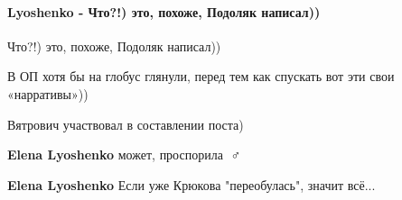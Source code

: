  
 
 
 
 
\paragraph{Lyoshenko - Что?!) это, похоже, Подоляк написал))}
\label{sec:14_07_2021.fb.krjukova_svetlana.1.statja_putina_mnenie.cmt.lyoshenko_podoljak}

\begin{itemize}
 
Что?!) это, похоже, Подоляк написал))

В ОП хотя бы на глобус глянули, перед тем как спускать вот эти свои «нарративы»))

\begin{itemize}
 
Вятрович участвовал в составлении поста)

 
\textbf{Elena Lyoshenko} может, проспорила 🤷♂️

 
\textbf{Elena Lyoshenko} Если уже Крюкова "переобулась", значит всё...


 

\end{itemize}
\end{itemize}
